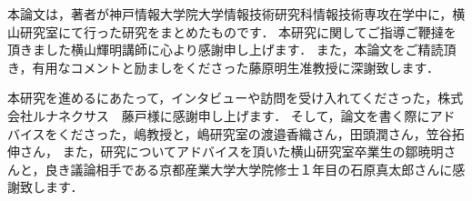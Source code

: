 本論文は，著者が神戸情報大学院大学情報技術研究科情報技術専攻在学中に，横山研究室にて行った研究をまとめたものです．
本研究に関してご指導ご鞭撻を頂きました横山輝明講師に心より感謝申し上げます．
また，本論文をご精読頂き，有用なコメントと励ましをくださった藤原明生准教授に深謝致します．
\medskip

本研究を進めるにあたって，インタビューや訪問を受け入れてくださった，株式会社ルナネクサス　藤戸様に感謝申し上げます．
そして，論文を書く際にアドバイスをくださった，嶋教授と，嶋研究室の渡邉香織さん，田頭潤さん，笠谷拓伸さん，
また，研究についてアドバイスを頂いた横山研究室卒業生の鄒暁明さんと，良き議論相手である京都産業大学大学院修士１年目の石原真太郎さんに感謝致します．




